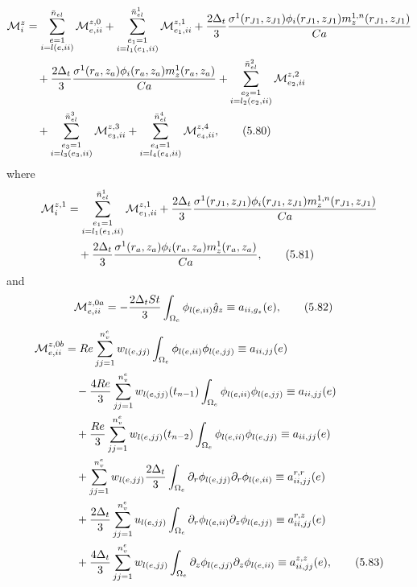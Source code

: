 \documentclass{article}
\begin{document}
\begin{align}
\mathcal{M}_i^z &= \sum_{\substack{e=1\\ i=l(e,ii)}}^{\bar{n}_{el}} \mathcal{M}_{e,ii}^{z,0} + \sum_{\substack{e_1=1\\ i=l_1(e_1,ii)}}^{\bar{n}_{el}^1} \mathcal{M}_{e_1,ii}^{z,1} + \frac{2\Delta_t}{3} \frac{\sigma^1(r_{J1},z_{J1}) \phi_i(r_{J1},z_{J1}) m_z^{1,n}(r_{J1},z_{J1})}{Ca} \nonumber\\
&\quad + \frac{2\Delta_t}{3} \frac{\sigma^1(r_a,z_a) \phi_i(r_a,z_a) m_z^{1}(r_a,z_a)}{Ca} + \sum_{\substack{e_2=1\\ i=l_2(e_2,ii)}}^{\bar{n}_{el}^2} \mathcal{M}_{e_2,ii}^{z,2} \nonumber\\
&\quad + \sum_{\substack{e_3=1\\ i=l_3(e_3,ii)}}^{\bar{n}_{el}^3} \mathcal{M}_{e_3,ii}^{z,3} + \sum_{\substack{e_4=1\\ i=l_4(e_4,ii)}}^{\bar{n}_{el}^4} \mathcal{M}_{e_4,ii}^{z,4}, \tag{5.80}
\end{align}
where
\begin{align}
\mathcal{M}_i^{z,1} &= \sum_{\substack{e_1=1\\ i=l_1(e_1,ii)}}^{\bar{n}_{el}^1} \mathcal{M}_{e_1,ii}^{z,1} + \frac{2\Delta_t}{3} \frac{\sigma^1(r_{J1},z_{J1}) \phi_i(r_{J1},z_{J1}) m_z^{1,n}(r_{J1},z_{J1})}{Ca} \nonumber\\
&\quad + \frac{2\Delta_t}{3} \frac{\sigma^1(r_a,z_a) \phi_i(r_a,z_a) m_z^{1}(r_a,z_a)}{Ca}, \tag{5.81}
\end{align}
and
\begin{align}
\mathcal{M}_{e,ii}^{z,0a} &= -\frac{2\Delta_t St}{3} \int_{\Omega_e} \phi_{l(e,ii)} \hat{g}_z \equiv a_{ii,g_z}(e), \tag{5.82}
\end{align}
\begin{align}
\mathcal{M}_{e,ii}^{z,0b} &= Re \sum_{jj=1}^{n_v^e} w_{l(e,jj)} \int_{\Omega_e} \phi_{l(e,ii)} \phi_{l(e,jj)} \equiv a_{ii,jj}(e) \nonumber\\
&\quad - \frac{4Re}{3} \sum_{jj=1}^{n_v^e} w_{l(e,jj)}(t_{n-1}) \int_{\Omega_e} \phi_{l(e,ii)} \phi_{l(e,jj)} \equiv a_{ii,jj}(e) \nonumber\\
&\quad + \frac{Re}{3} \sum_{jj=1}^{n_v^e} w_{l(e,jj)}(t_{n-2}) \int_{\Omega_e} \phi_{l(e,ii)} \phi_{l(e,jj)} \equiv a_{ii,jj}(e) \nonumber\\
&\quad + \sum_{jj=1}^{n_v^e} w_{l(e,jj)} \frac{2\Delta_t}{3} \int_{\Omega_e} \partial_r \phi_{l(e,jj)} \partial_r \phi_{l(e,ii)} \equiv a_{ii,jj}^{r,r}(e) \nonumber\\
&\quad + \frac{2\Delta_t}{3} \sum_{jj=1}^{n_v^e} u_{l(e,jj)} \int_{\Omega_e} \partial_r \phi_{l(e,ii)} \partial_z \phi_{l(e,jj)} \equiv a_{ii,jj}^{r,z}(e) \nonumber\\
&\quad + \frac{4\Delta_t}{3} \sum_{jj=1}^{n_v^e} w_{l(e,jj)} \int_{\Omega_e} \partial_z \phi_{l(e,jj)} \partial_z \phi_{l(e,ii)} \equiv a_{ii,jj}^{z,z}(e), \tag{5.83}
\end{align}
\end{document}
